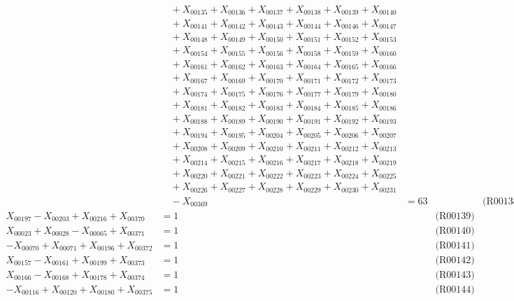 \documentclass[a4paper,10pt]{article}
\begin{document}
{\begin{align}
&\quad  + X_{00135} + X_{00136} + X_{00137} + X_{00138} + X_{00139} + X_{00140} \\[0.5ex]
&\quad  + X_{00141} + X_{00142} + X_{00143} + X_{00144} + X_{00146} + X_{00147} \\[0.5ex]
&\quad  + X_{00148} + X_{00149} + X_{00150} + X_{00151} + X_{00152} + X_{00153} \\[0.5ex]
&\quad  + X_{00154} + X_{00155} + X_{00156} + X_{00158} + X_{00159} + X_{00160} \\[0.5ex]
&\quad  + X_{00161} + X_{00162} + X_{00163} + X_{00164} + X_{00165} + X_{00166} \\[0.5ex]
&\quad  + X_{00167} + X_{00169} + X_{00170} + X_{00171} + X_{00172} + X_{00173} \\[0.5ex]
&\quad  + X_{00174} + X_{00175} + X_{00176} + X_{00177} + X_{00179} + X_{00180} \\[0.5ex]
&\quad  + X_{00181} + X_{00182} + X_{00183} + X_{00184} + X_{00185} + X_{00186} \\[0.5ex]
&\quad  + X_{00188} + X_{00189} + X_{00190} + X_{00191} + X_{00192} + X_{00193} \\[0.5ex]
&\quad  + X_{00194} + X_{00195} + X_{00204} + X_{00205} + X_{00206} + X_{00207} \\[0.5ex]
&\quad  + X_{00208} + X_{00209} + X_{00210} + X_{00211} + X_{00212} + X_{00213} \\[0.5ex]
&\quad  + X_{00214} + X_{00215} + X_{00216} + X_{00217} + X_{00218} + X_{00219} \\[0.5ex]
&\quad  + X_{00220} + X_{00221} + X_{00222} + X_{00223} + X_{00224} + X_{00225} \\[0.5ex]
&\quad  + X_{00226} + X_{00227} + X_{00228} + X_{00229} + X_{00230} + X_{00231} \\[0.5ex]
&\quad  - X_{00369} &= 63 && \text{(R00138)} \\
X_{00197} - X_{00203} + X_{00216} + X_{00370} &= 1 && \text{(R00139)} \\
X_{00023} + X_{00028} - X_{00065} + X_{00371} &= 1 && \text{(R00140)} \\
\allowbreak
-X_{00070} + X_{00071} + X_{00196} + X_{00372} &= 1 && \text{(R00141)} \\
X_{00157} - X_{00161} + X_{00199} + X_{00373} &= 1 && \text{(R00142)} \\
X_{00166} - X_{00168} + X_{00178} + X_{00374} &= 1 && \text{(R00143)} \\
-X_{00116} + X_{00120} + X_{00180} + X_{00375} &= 1 && \text{(R00144)} \\

\end{align}}
\end{document}
